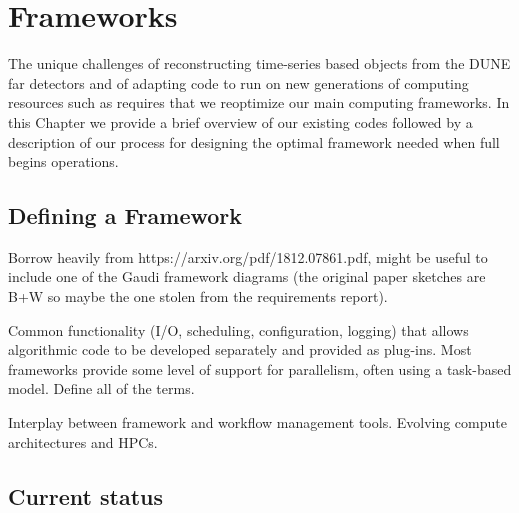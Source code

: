 \documentclass[../main-v1.tex]{subfiles}
\begin{document}
\chapter{Frameworks }
\label{ch:fworks}

The unique challenges of reconstructing time-series based objects from the DUNE far detectors and of adapting code to run on new generations of computing resources such as  requires that we reoptimize our main computing frameworks.  In this Chapter we provide a brief overview of our existing codes followed by a description of our process for designing the optimal framework needed when full  begins operations.  

\section{Defining a Framework}

Borrow heavily from https://arxiv.org/pdf/1812.07861.pdf, might be useful to include one of the Gaudi framework diagrams (the original paper sketches are B+W so maybe the one stolen from the requirements report).

Common functionality (I/O, scheduling, configuration, logging) that allows algorithmic code to be developed separately and provided as plug-ins.  Most frameworks provide some level of support for parallelism, often using a task-based model. Define all of the terms.

Interplay between framework and workflow management tools.  Evolving compute architectures and HPCs.



\section{Current status }
\end{document}
